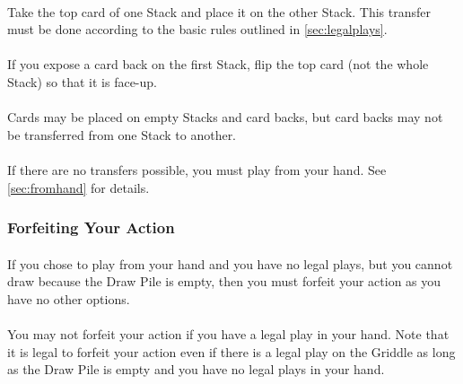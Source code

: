 \documentclass{article}
\begin{document}
\paragraph{} \label{par:transfer}
Take the top card of one Stack and place it on the other Stack. This transfer must be done according to the basic rules outlined in \autoref{sec:legalplays}.

\paragraph{} \label{par:expose}
If you expose a card back on the first Stack, flip the top card (not the whole Stack) so that it is face-up.

\paragraph{} \label{par:nocardbacktransfer}
Cards may be placed on empty Stacks and card backs, but card backs may not be transferred from one Stack to another.

\paragraph{} \label{par:notransferfallback}
If there are no transfers possible, you must play from your hand. See \autoref{sec:fromhand} for details.

\subsubsection{Forfeiting Your Action}
\label{sec:forfeitaction}

\paragraph{} \label{par:forfeitactioncondition}
If you chose to play from your hand and you have no legal plays, but you cannot draw because the Draw Pile is empty, then you must forfeit your action as you have no other options.

\paragraph{} \label{par:forfeitactionrestriction}
You may not forfeit your action if you have a legal play in your hand. Note that it is legal to forfeit your action even if there is a legal play on the Griddle as long as the Draw Pile is empty and you have no legal plays in your hand.
\end{document}
